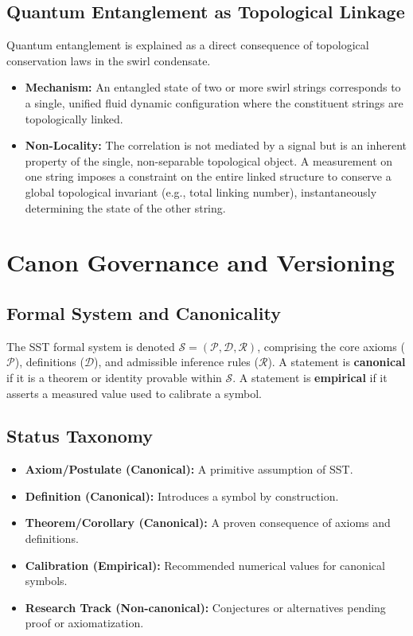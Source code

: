 \documentclass[11pt]{article}
\begin{document}
\subsection{Quantum Entanglement as Topological Linkage}
    Quantum entanglement is explained as a direct consequence of topological conservation laws in the swirl condensate.
    \begin{itemize}
    \item \textbf{Mechanism:} An entangled state of two or more swirl strings corresponds to a single, unified fluid dynamic configuration where the constituent strings are topologically linked.
    \item \textbf{Non-Locality:} The correlation is not mediated by a signal but is an inherent property of the single, non-separable topological object. A measurement on one string imposes a constraint on the entire linked structure to conserve a global topological invariant (e.g., total linking number), instantaneously determining the state of the other string.
    \end{itemize}

    \appendix
\section{Canon Governance and Versioning}
\subsection{Formal System and Canonicality}
    The SST formal system is denoted $\mathcal{S}=(\mathcal{P},\mathcal{D},\mathcal{R})$, comprising the core axioms ($\mathcal{P}$), definitions ($\mathcal{D}$), and admissible inference rules ($\mathcal{R}$). A statement is \textbf{canonical} if it is a theorem or identity provable within $\mathcal{S}$. A statement is \textbf{empirical} if it asserts a measured value used to calibrate a symbol.

\subsection{Status Taxonomy}
    \begin{itemize}
    \item \textbf{Axiom/Postulate (Canonical):} A primitive assumption of SST.
    \item \textbf{Definition (Canonical):} Introduces a symbol by construction.
    \item \textbf{Theorem/Corollary (Canonical):} A proven consequence of axioms and definitions.
    \item \textbf{Calibration (Empirical):} Recommended numerical values for canonical symbols.
    \item \textbf{Research Track (Non-canonical):} Conjectures or alternatives pending proof or axiomatization.
    \end{itemize}
\end{document}
